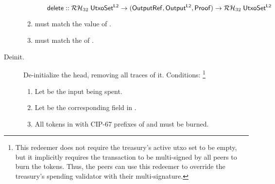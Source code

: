 \documentclass[../hydrozoa.tex]{subfiles}
\begin{document}
\begin{description}
\begin{enumerate}
\begin{enumerate}
\begin{equation*}
              \mathsf{delete} ::
                \mathcal{RH}_{32} \; \mathsf{UtxoSet^{L2}} ->
                (\mathsf{OutputRef}, \mathsf{Output^{L2}}, \mathsf{Proof}) ->
                \mathcal{RH}_{32} \; \mathsf{UtxoSet^{L2}}
            \end{equation*}
        \end{enumerate}
      \item {} must match the value of .
      \item {} must match the  of .
    \end{enumerate}
  \item[Deinit.] De-initialize the head, removing all traces of it.
    Conditions:%
    \footnote{This redeemer does not require the treasury's active utxo set to be empty, but it implicitly requires the transaction to be multi-signed by all peers to burn the  tokens.
      Thus, the peers can use this redeemer to override the treasury's spending validator with their multi-signature.}
    \begin{enumerate}
      \item Let  be the input being spent.
      \item Let  be the corresponding field in .
      \item All  tokens in  with CIP-67 prefixes of \headDisputeToken{} and \headBeaconToken{} must be burned.
    \end{enumerate}
\end{description}
\end{document}
